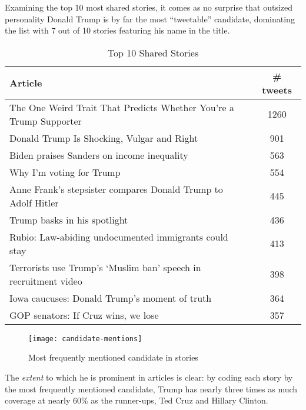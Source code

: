 Examining the top 10 most shared stories, it comes as no surprise that outsized personality Donald Trump is by far the most ``tweetable'' candidate, dominating the list with 7 out of 10 stories featuring his name in the title.

 
\begin{table}
\begin{tabular}{ |l c| } 
    \hline
    Article &  \# tweets \\
    \hline
    The One Weird Trait That Predicts Whether You're a Trump Supporter &   1260 \\
    Donald Trump Is Shocking, Vulgar and Right                         &    901 \\
    Biden praises Sanders on income inequality                         &    563 \\
    Why I'm voting for Trump                                           &    554 \\
    Anne Frank's stepsister compares Donald Trump to Adolf Hitler      &    445 \\
    Trump basks in his spotlight                                       &    436 \\
    Rubio: Law-abiding undocumented immigrants could stay              &    413 \\
    Terrorists use Trump's `Muslim ban' speech in recruitment video    &    398 \\
    Iowa caucuses: Donald Trump's moment of truth                      &    364 \\
    GOP senators: If Cruz wins, we lose                                &    357 \\
    \hline
\end{tabular}
\caption{\label{tab:top-10}Top 10 Shared Stories}
\end{table}

\begin{figure}[H]  
\centering 
  \texttt{[image: candidate-mentions]}  
  \caption{Most frequently mentioned candidate in stories
    \label{fig:tweets-by-pub}}
\end{figure} 

The \emph{extent} to which he is prominent in articles is clear: by coding each story by the most frequently mentioned candidate, Trump has nearly three times as much coverage at nearly 60\% as the runner-ups, Ted Cruz and Hillary Clinton.

